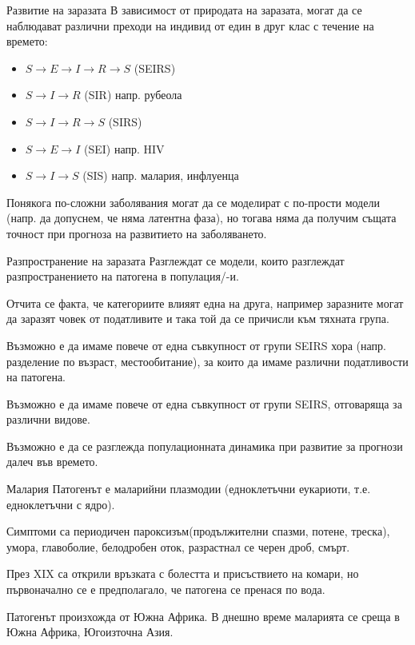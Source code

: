 \begin{frame}[t]{Развитие на заразата}
  В зависимост от природата на заразата, могат да се наблюдават различни преходи на индивид от един в друг клас с течение на времето:
  \begin{itemize}
    \item $S \rightarrow E \rightarrow I \rightarrow R \rightarrow S$ (SEIRS)
    \item $S \rightarrow I \rightarrow R$ (SIR) напр. рубеола
    \item $S \rightarrow I \rightarrow R \rightarrow S$ (SIRS)
    \item $S \rightarrow E \rightarrow I$ (SEI) напр. HIV
    \item $S \rightarrow I \rightarrow S$ (SIS) напр. малария, инфлуенца
  \end{itemize}
  Понякога по-сложни заболявания могат да се моделират с по-прости модели (напр. да допуснем, че няма латентна фаза), но тогава няма да получим същата точност при прогноза на развитието на заболяването.
\end{frame}

\begin{frame}[t]{Разпространение на заразата}
  Разглеждат се модели, които разглеждат разпространението на патогена в популация/-и.

  Отчита се факта, че категориите влияят една на друга, например заразните могат да заразят човек от податливите и така той да се причисли към тяхната група.

  Възможно е да имаме повече от една съвкупност от групи SEIRS хора (напр. разделение по възраст, местообитание), за които да имаме различни податливости на патогена.

  Възможно е да имаме повече от една съвкупност от групи SEIRS, отговаряща за различни видове.

  Възможно е да се разглежда популационната динамика при развитие за прогнози далеч във времето.
\end{frame}

\begin{frame}[t]{Малария}
  Патогенът е маларийни плазмодии (едноклетъчни еукариоти, т.е. едноклетъчни с ядро).

  Симптоми са периодичен пароксизъм(продължителни спазми, потене, треска), умора, главоболие, белодробен оток, разрастнал се черен дроб, смърт.

  През XIX са открили връзката с болестта и присъствието на комари, но първоначално се е предполагало, че патогена се пренася по вода.

  Патогенът произхожда от Южна Африка.
  В днешно време маларията се среща в Южна Африка, Югоизточна Азия.
\end{frame}

